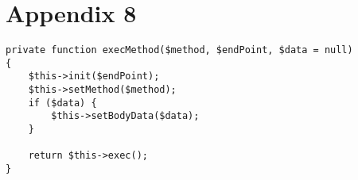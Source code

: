 \section*{Appendix 8}
\label{sec:app8}

\begin{lstlisting}
private function execMethod($method, $endPoint, $data = null)
{
    $this->init($endPoint);
    $this->setMethod($method);
    if ($data) {
        $this->setBodyData($data);
    }

    return $this->exec();
}

\end{lstlisting}
